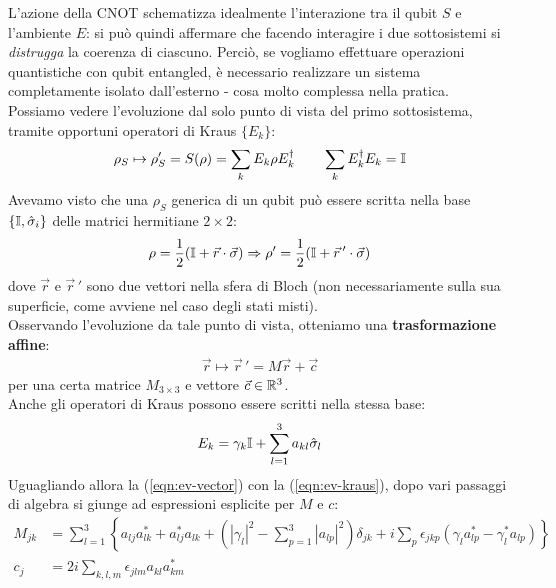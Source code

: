 \documentclass[../../InformazioneQuantistica.tex]{subfiles}
\begin{document}
L'azione della CNOT schematizza idealmente l'interazione tra il qubit $S$ e l'ambiente $E$: si può quindi affermare che facendo interagire i due sottosistemi si \textit{distrugga} la coerenza di ciascuno. Perciò, se vogliamo effettuare operazioni quantistiche con qubit entangled, è necessario realizzare un sistema completamente isolato dall'esterno - cosa molto complessa nella pratica.\\

Possiamo vedere l'evoluzione  dal solo punto di vista del primo sottosistema, tramite opportuni operatori di Kraus $\{E_k\}$:
\begin{align}
\rho_S \mapsto \rho'_S = S(\rho) = \sum_{k} E_k \rho E_k^\dag \qquad \sum_k E_k^\dag E_k = \mathbb{I}
\label{eqn:ev-kraus}
\end{align}
Avevamo visto che una $\rho_S$ generica di un qubit può essere scritta nella base $\{\mathbb{I}, \hat{\sigma}_i\}$ delle matrici hermitiane $2\times 2$:
\begin{align}
\rho = \frac{1}{2}(\mathbb{I}+\vec{r}\cdot \vec{\sigma}) \Rightarrow  \rho'=\frac{1}{2}(\mathbb{I}+\vec{r}\,'\cdot \vec{\sigma})
\label{eqn:ev-vector}
\end{align}
dove $\vec{r}$ e $\vec{r}\,'$ sono due vettori nella sfera di Bloch (non necessariamente sulla sua superficie, come avviene nel caso degli stati misti).\\
Osservando l'evoluzione da tale punto di vista, otteniamo una \textbf{trasformazione affine}:
\begin{align*}
\vec{r} \mapsto \vec{r}\,' = M\vec{r} + \vec{c}
\end{align*}
per una certa matrice $M_{3\times 3}$ e vettore $\vec{c} \in \mathbb{R}^3$.\\
Anche gli operatori di Kraus possono essere scritti nella stessa base:
\begin{align*}
E_k = \gamma_k \mathbb{I} + \sum_{l=1}^3 a_{kl}\hat{\sigma}_l
\end{align*}
Uguagliando allora la (\ref{eqn:ev-vector}) con la (\ref{eqn:ev-kraus}), dopo vari passaggi di algebra si giunge ad espressioni esplicite per $M$ e $c$:
\begin{align*}
M_{jk} &= \sum_{l=1}^3 \left\{ a_{lj}a_{lk}^* + a_{lj}^*a_{lk} + \left(|\gamma_l|^2 - \sum_{p=1}^3 |a_{lp}|^2 \right)\delta_{jk} + i\sum_p \epsilon_{jkp}(\gamma_l a^*_{lp}-\gamma^*_l a_{lp})\right\}\\
c_{j} &= 2i \sum_{k,l,m} \epsilon_{jlm}a_{kl}a_{km}^*
\end{align*}
\end{document}
